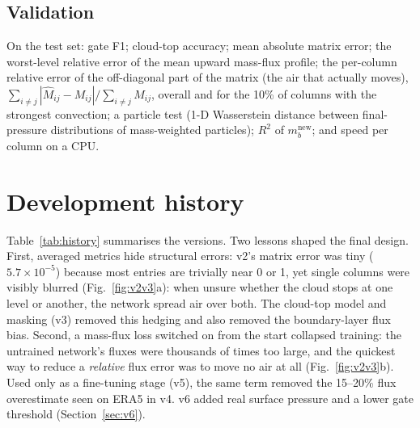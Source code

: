 \documentclass[11pt,a4paper]{article}
\begin{document}
\subsection{Validation}
On the test set: gate F1; cloud-top accuracy; mean absolute matrix error; the worst-level relative
error of the mean upward mass-flux profile; the per-column relative error of the off-diagonal part of
the matrix (the air that actually moves), $\sum_{i\neq j}|\hat M_{ij}-M_{ij}| / \sum_{i\neq j} M_{ij}$,
overall and for the 10\% of columns with the strongest convection; a particle test (1-D Wasserstein
distance between final-pressure distributions of mass-weighted particles); $R^2$ of
$m_b^{\text{new}}$; and speed per column on a CPU.

\section{Development history}
Table~\ref{tab:history} summarises the versions. Two lessons shaped the final design. First,
averaged metrics hide structural errors: v2's matrix error was tiny ($5.7\times10^{-5}$) because most
entries are trivially near 0 or 1, yet single columns were visibly blurred
(Fig.~\ref{fig:v2v3}a): when unsure whether the cloud stops at one level or another, the network spread
air over both. The cloud-top model and masking (v3) removed this hedging and also removed the
boundary-layer flux bias. Second, a mass-flux loss switched on from the start collapsed training:
the untrained network's fluxes were thousands of times too large, and the quickest way to reduce a
\emph{relative} flux error was to move no air at all (Fig.~\ref{fig:v2v3}b). Used only as a
fine-tuning stage (v5), the same term removed the 15--20\% flux overestimate seen on ERA5 in v4.
v6 added real surface pressure and a lower gate threshold (Section~\ref{sec:v6}).
\end{document}
